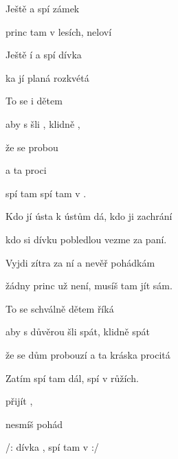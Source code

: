 

\zs
Ještě  a spí zámek 

 princ tam v lesích,  neloví

Ještě í a spí dívka 

ka jí planá  rozkvétá    

To se i dětem     

aby s  šli , klidně ,

že se  probou

a ta  proci  

 spí tam  spí tam v .
\ks

\zs
Kdo jí ústa k ústům dá, kdo ji zachrání

kdo si dívku pobledlou vezme za paní.

Vyjdi zítra za ní a nevěř pohádkám

žádny princ už není, musíš tam jít sám.

To se schválně dětem říká

aby s důvěrou šli spát, klidně spát

že se dům probouzí a ta kráska procitá

Zatím spí tam dál, spí v růžích.
\ks

\zs
{} přijít ,

nesmíš  pohád  

/:  dívka , spí tam v  :/
\ks

\kp






















